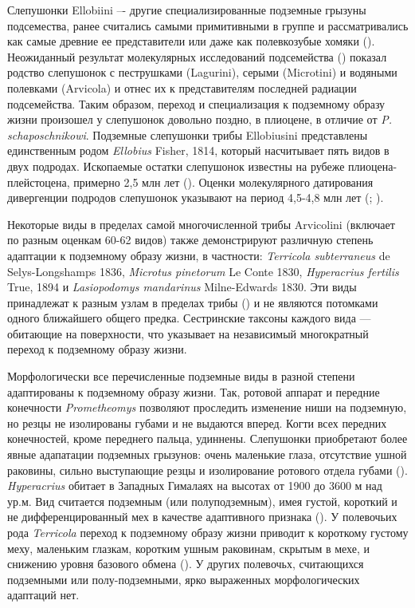 Слепушонки Ellobiini –- другие специализированные подземные грызуны подсемества, ранее считались самыми примитивными в группе и рассматривались как самые древние ее представители или даже как полевкозубые хомяки (\cite{Gromov1977}). Неожиданный результат молекулярных исследований подсемейства (\cite{Abramson2009}) показал родство слепушонок с пеструшками (Lagurini), серыми (Microtini) и водяными полевками (Arvicola) и отнес их к представителям последней радиации подсемейства. Таким образом, переход и специализация к подземному образу жизни произошел у слепушонок довольно поздно, в плиоцене, в отличие от \textit{P. schaposchnikowi}. Подземные слепушонки трибы Ellobiusini представлены единственным родом \textit{Ellobius} Fisher, 1814, который насчитывает пять видов в двух подродах. Ископаемые остатки слепушонок известны на рубеже плиоцена-плейстоцена, примерно 2,5 млн лет (\cite{Lychev1974}). Оценки молекулярного датирования дивергенции подродов слепушонок указывают на период 4,5-4,8 млн лет (\cite{Abramson2009}; \cite{Lebedev2020}). 

Некоторые виды в пределах самой многочисленной трибы Arvicolini (включает по разным оценкам 60-62 видов) также демонстрируют различную степень адаптации к подземному образу жизни, в частности: \textit{Terricola subterraneus} de Selys-Longshamps 1836, \textit{Microtus pinetorum} Le Conte 1830, \textit{Hyperacrius fertilis} True, 1894 и \textit{Lasiopodomys mandarinus} Milne-Edwards 1830. Эти виды принадлежат к разным узлам в пределах трибы (\cite{Martinkova2012}) и не являются потомками одного ближайшего общего предка. Сестринские таксоны каждого вида — обитающие на поверхности, что указывает на независимый многократный переход к подземному образу жизни. 

Морфологически все перечисленные подземные виды в разной степени адаптированы к подземному образу жизни. Так, ротовой аппарат и передние конечности \textit{Prometheomys} позволяют проследить изменение ниши на подземную, но резцы не изолированы губами и не выдаются вперед. Когти всех передних конечностей, кроме переднего пальца, удиннены. Слепушонки приобретают более явные адапатации подземных грызунов: очень маленькие глаза, отсутствие ушной раковины, сильно выступающие резцы и изолирование ротового отдела губами (\cite{Gromov1977}). \textit{Hyperacrius} обитает в Западных Гималаях на высотах от 1900 до 3600 м над ур.м. Вид считается подземным (или полуподземным), имея густой, короткий и не дифференцированный мех в качестве адаптивного признака (\cite{Gromov1977}). У полевочьих рода \textit{Terricola} переход к подземному образу жизни приводит к короткому густому меху, маленьким глазкам, коротким ушным раковинам, скрытым в мехе, и снижению уровня базового обмена (\cite{Gromov1977}). У других полевочьх, считающихся подземными или полу-подземными, ярко выраженных морфологических адаптаций нет.  

